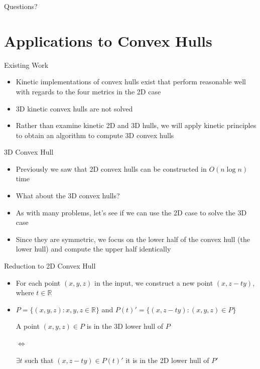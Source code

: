 \documentclass[aspectratio=169, handout]{beamer}
\begin{document}
\begin{frame}{}
      \begin{center}
    {\color{sigma@mainblue} \LARGE Questions?}
  \end{center}
\end{frame}

\section{Applications to Convex Hulls}
\frame{\sectionpage}

\begin{frame}{Existing Work}
    \begin{itemize}
        \item Kinetic implementations of convex hulls exist that perform reasonable well with regards to the four metrics in the 2D case
        \item 3D kinetic convex hulls are not solved
        \pause
        \item Rather than examine kinetic 2D and 3D hulls, we will apply kinetic principles to obtain an algorithm to compute 3D convex hulls
    \end{itemize}
    \nocite{wiki2}
\end{frame}

\begin{frame}{3D Convex Hull}
    \begin{itemize}
        \item Previously we saw that 2D convex hulls can be constructed in $O(n \log n)$ time
        \item What about the 3D convex hulls?
        \pause
        \item As with many problems, let's see if we can use the 2D case to solve the 3D case
        \item Since they are symmetric, we focus on the lower half of the convex hull (the lower hull) and compute the upper half identically
    \end{itemize}
\end{frame}

\begin{frame}{Reduction to 2D Convex Hull}
    \begin{itemize}
        \item For each point $(x, y, z)$ in the input, we construct a new point $(x, z - ty)$, where $t \in \mathbb R$
        \item $P = \{(x, y, z) : x, y, z \in \mathbb R\}$ and $P(t)' = \{(x, z - ty) : (x, y, z) \in P\}$
        \begin{lem}
            \begin{center}
            A point $(x, y, z) \in P$ is in the 3D lower hull of $P$
            
            $\iff$
            
            $\exists t$ such that $(x, z - ty) \in P(t)'$ it is in the 2D lower hull of $P'$
            \end{center}
        \end{lem}
    \end{itemize}
    \nocite{site:chan}
\end{frame}
\end{document}
